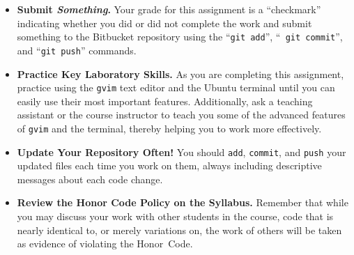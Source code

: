           \begin{itemize}
            \item {\bf Submit \textbf{\textit{Something}}.} Your grade for this assignment is a ``checkmark'' indicating whether you
              did or did not complete the work and submit something to the Bitbucket repository using the ``{\tt git add}'', ``{\tt
              git commit}'', and ``{\tt git push}'' commands.

            \item {\bf Practice Key Laboratory Skills.} As you are completing this assignment, practice using the {\tt gvim} text
              editor and the Ubuntu terminal until you can easily use their most important features.  Additionally, ask
              a teaching assistant or the course instructor to teach you some of the advanced features of {\tt gvim} and the
              terminal, thereby helping you to work more effectively.

            \item {\bf Update Your Repository Often!} You should {\tt add}, {\tt commit}, and {\tt push} your updated files each
              time you work on them, always including descriptive messages about each code change.

            \item {\bf Review the Honor Code Policy on the Syllabus.} Remember that while you may discuss your work with other
              students in the course, code that is nearly identical to, or merely variations on, the work of others will be
              taken as evidence of violating the \mbox{Honor Code}.

          \end{itemize}
          
